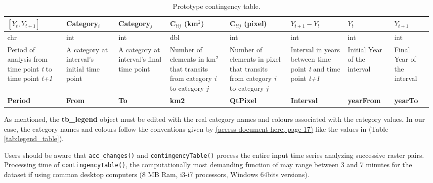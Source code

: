 \begin{table}[htbp]
\centering
\caption{Prototype contingency table.}
\label{tab:prototype}
\begin{tabular}[t]{>{\centering}p{}<{\small}>{\centering}p{}<{\small}>{\centering}p{}<{\small}>{\small}p{}<{\centering}>{\small}p{}<{\centering}>{\small}p{}<{\centering}>{\small}p{}<{\centering}>{\small}p{}<{\centering}}
\toprule
\([Y_t,Y_{t+1}]\) & Category\(_i\) & Category\(_j\) & C\(_{tij}\) (km\(^2\)) & C\(_{tij}\) (pixel) & \(Y_{t+1} - Y_t\) & \(Y_t\) & \(Y_{t+1}\) \\
\midrule
chr & int & int & dbl & int & int & int & int \\

Period of analysis from time point \textit{t} to time point \textit{t+1} & A category at interval's initial time point & A category at  interval's final time point & Number of elements in km\(^2\) that transits from category \textit{i} to category \textit{j} & Number of elements in pixel that transits from category \textit{i} to category \textit{j} & Interval in years between time point \textit{t} and time point \textit{t+1} & Initial Year of the interval & Final Year of the interval \\
\textbf{Period} & \textbf{From} & \textbf{To} & \textbf{km2} & \textbf{QtPixel} & \textbf{Interval} & \textbf{yearFrom} & \textbf{yearTo} \\
\bottomrule
\end{tabular}
\end{table}

As mentioned, the \textbf{tb\_legend} object must be edited with the
real category names and colours associated with the category values. In
our case, the category names and colours follow the conventions given by
\citep{sospantanal2015}
\href{https://www.embrapa.br/documents/1354999/1529097/BAP+-+Mapeamento+da+Bacia+do+Alto+Paraguai+-+estudo+completo/e66e3afb-2334-4511-96a0-af5642a56283}{(access
document here, page 17)} like the values in (Table
\ref{tab:legend_table}).

Users should be aware that \texttt{acc\_changes()} and \texttt{contingencyTable()} process the entire input time series analyzing successive raster pairs. Processing time of \texttt{contingencyTable()}, the computationally most demanding function of  may range between 3 and 7 minutes for the  dataset if using common desktop computers (8 MB Ram, i3-i7 processors, Windows 64bits versions).

